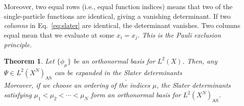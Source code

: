 \documentclass{report}
\theoremstyle{plain}
\newtheorem{theorem}{Theorem}[chapter]
\theoremstyle{definition}
\begin{document}
Moreover, two equal rows (i.e., equal function indices) means that two
of the single-particle functions are identical, giving a vanishing
determinant. 
If two \emph{columns} in Eq.~\eqref{eq:slater} are identical, the
determinant vanishes. Two columns equal mean that we evaluate at some
$x_i = x_j$. \emph{This is the Pauli
  exclusion principle.} 

\begin{theorem}
  Let $\{\phi_\mu\}$ be an orthonormal basis for
  $L^2(X)$. Then, any $\Psi \in L^2(X^N)_\text{AS}$ can be expanded in
  the Slater determinants
  \begin{equation}
    [\phi_{\mu_1},\phi_{\mu_2},\cdots,\phi_{\mu_N}].
  \end{equation}
  Moreover, if we choose an ordering of the indices $\mu$, the Slater
  determinants satisfying $\mu_1<\mu_2<\cdots<\mu_N$ form an
  orthonormal basis for $L^2(X^N)_\text{AS}$.
\end{theorem}
\end{document}
